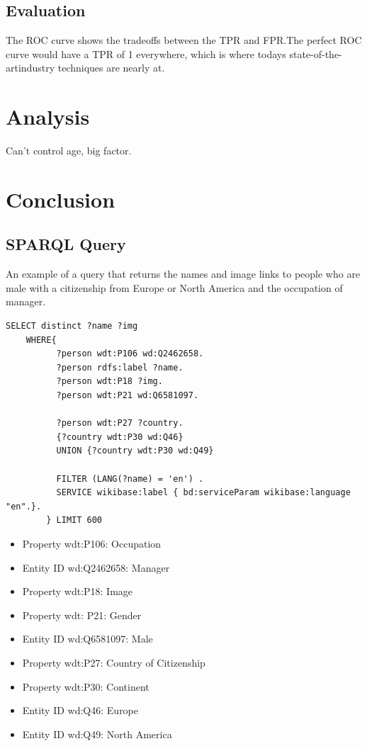 \documentclass[12pt,english]{article}
\begin{document}
\subsection{Evaluation}

The ROC curve shows the tradeoffs between the TPR and FPR.The perfect ROC curve would have a TPR of 1 everywhere, which is where todays state-of-the-artindustry techniques are nearly at. \cite{amos}

\section{Analysis}

Can't control age, big factor.

\section{Conclusion}

\begin{appendices}
\section{SPARQL Query}
\label{appen1}
An example of a query that returns the names and image links to people who are male with a citizenship from Europe or North America and the occupation of manager.
 
\begin{verbatim}
SELECT distinct ?name ?img
    WHERE{
          ?person wdt:P106 wd:Q2462658.
          ?person rdfs:label ?name.
          ?person wdt:P18 ?img.
          ?person wdt:P21 wd:Q6581097.
          
          ?person wdt:P27 ?country.
          {?country wdt:P30 wd:Q46} 
          UNION {?country wdt:P30 wd:Q49}
          
          FILTER (LANG(?name) = 'en') .
          SERVICE wikibase:label { bd:serviceParam wikibase:language "en".}.
        } LIMIT 600
\end{verbatim}

\begin{itemize}
\item Property wdt:P106: Occupation
\item Entity ID wd:Q2462658: Manager
\item Property wdt:P18: Image
\item Property wdt: P21: Gender
\item Entity ID wd:Q6581097: Male
\item Property wdt:P27: Country of Citizenship
\item Property wdt:P30: Continent
\item Entity ID wd:Q46: Europe
\item Entity ID wd:Q49: North America
\end{itemize}


\end{appendices}

\nocite{*}

\printbibliography
\end{document}
